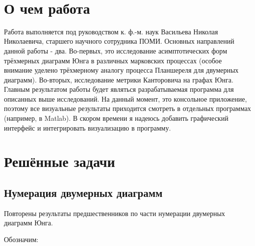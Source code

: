 \documentclass[12pt]{report}
\begin{document}
\newpage
\hfill {}\\
\section* {О чем работа}
\hspace{\parindent} Работа выполняется под руководством к. ф.-м. наук Васильева Николая Николаевича, старшего научного сотрудника ПОМИ. Основных направлений данной работы - два. Во-первых, это исследование асимптотических форм трёхмерных диаграмм Юнга в различных марковских процессах (особое внимание уделено трёхмерному аналогу процесса Планшереля для двумерных диаграмм). Во-вторых, исследование метрики Канторовича на графах Юнга. Главным результатом работы будет являться разрабатываемая программа для описанных выше исследований. На данный момент, это консольное приложение, поэтому все визуальные результаты приходится смотреть в отдельных программах (например, в Matlab). В скором времени я надеюсь добавить графический интерфейс и интегрировать визуализацию в программу.
 
\section* {Решённые задачи}
\parindent=1cm
\newenvironment{myindentpar}[1]%
 {\begin{list}{}%
         {\setlength{\leftmargin}{#1}}%
         \item[]%
 }
 {\end{list}}
 
\subsection*{Нумерация двумерных диаграмм}
\hspace{\parindent} Повторены результаты предшественников по части нумерации двумерных диаграмм Юнга. 

Обозначим: 
\end{document}
